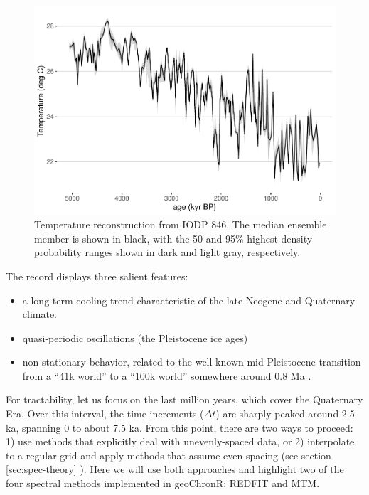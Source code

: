 \documentclass[gchron, manuscript]{copernicus}
\begin{document}
\begin{figure}
\includegraphics[width=12cm]{geoChronR-paper_files/figure-latex/odp846-timeseries-1} \caption{Temperature reconstruction from IODP 846. The median ensemble member is shown in black, with the 50 and 95\% highest-density probability ranges shown in dark and light gray, respectively.}\label{fig:odp846-timeseries}
\end{figure}

The record displays three salient features:

\begin{itemize}
\item
  a long-term cooling trend characteristic of the late Neogene and Quaternary climate.
\item
  quasi-periodic oscillations (the Pleistocene ice ages)
\item
  non-stationary behavior, related to the well-known mid-Pleistocene transition from a ``41k world'' to a ``100k world'' somewhere around 0.8 Ma \citep{Paillard_2001, LisieckiRaymo05, ahn2017}.
\end{itemize}

For tractability, let us focus on the last million years, which cover the Quaternary Era.
Over this interval, the time increments (\(\Delta t\)) are sharply peaked around 2.5 ka, spanning 0 to about 7.5 ka.
From this point, there are two ways to proceed: 1) use methods that explicitly deal with unevenly-spaced data, or 2) interpolate to a regular grid and apply methods that assume even spacing (see section \ref{sec:spec-theory} ). Here we will use both approaches and highlight two of the four spectral methods implemented in geoChronR: REDFIT and MTM.
\end{document}
